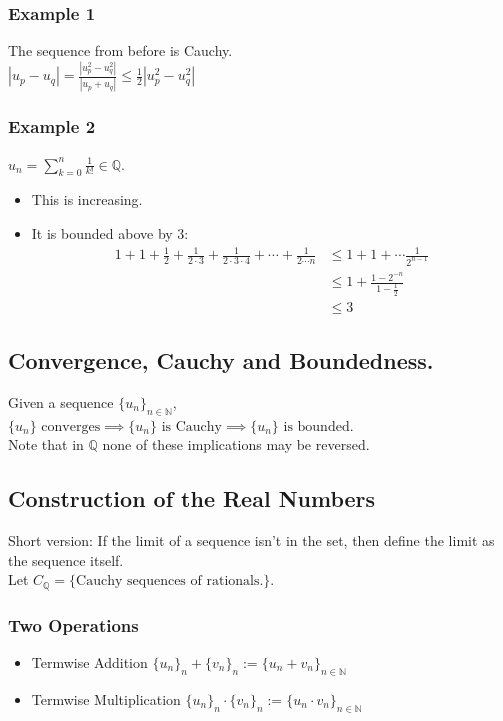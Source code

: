\documentclass[11pt]{article}
\newcommand{\0}{\emptyset}
\newcommand{\N}{\mathbb{N}}
\newcommand{\Q}{\mathbb{Q}}
\begin{document}
\subsubsection*{Example 1}
\label{sec:org21a38a3}
The sequence from before is Cauchy.\\[0pt]
\(|u_{p}-u_{q}|=\frac{|u_{p}^{2}-u_{q}^{2}|}{|u_{p}+u_{q}|} \leq \frac{1}{2}|u_{p}^{2}-u_{q}^{2}|\)\\[0pt]
\subsubsection*{Example 2}
\label{sec:orgded9bfe}
\(u_{n}=\sum_{k=0}^{n}\frac{1}{k!} \in\Q\).\\[0pt]
\begin{itemize}
\item This is increasing.\\[0pt]
\item It is bounded above by \(3\):\\[0pt]
\begin{align*}
 1+1+\frac{1}{2}+\frac{1}{2\cdot 3}+\frac{1}{2\cdot 3\cdot 4}+\cdots+\frac{1}{2\cdots n}
 &\leq 1+1+\cdots\frac{1}{2^{n-1}}
 \\&\leq 1+\frac{1-2^{-n}}{1-\frac{1}{2}}
 \\&\leq 3
\end{align*}
\end{itemize}
\subsection*{Convergence, Cauchy and Boundedness.}
\label{sec:org99baf47}
Given a sequence \(\{u_{n}\}_{n\in\N}\),\\[0pt]
  \(\{u_{n}\}\text{ converges}\implies\{u_{n}\}\text{ is Cauchy}\implies\{u_{n}\}\text{ is bounded}\).\\[0pt]
Note that in \(\Q\) none of these implications may be reversed.\\[0pt]
\subsection*{Construction of the Real Numbers}
\label{sec:orgdb23169}
Short version: If the limit of a sequence isn't in the set, then define the limit as the sequence itself.\\[0pt]
Let \(C_{\Q}=\{\text{Cauchy sequences of rationals.}\}\).\\[0pt]
\subsubsection*{Two Operations}
\label{sec:org6545bf7}
\begin{itemize}
\item Termwise Addition
\label{sec:org1f21cbc}
\(\{u_{n}\}_{n}+\{v_{n}\}_{n}:=\{u_{n}+v_{n}\}_{n\in\N}\)\\[0pt]
\item Termwise Multiplication
\label{sec:org003e982}
\(\{u_{n}\}_{n}\cdot\{v_{n}\}_{n}:=\{u_{n}\cdot v_{n}\}_{n\in\N}\)\\[0pt]
\end{itemize}
\end{document}
